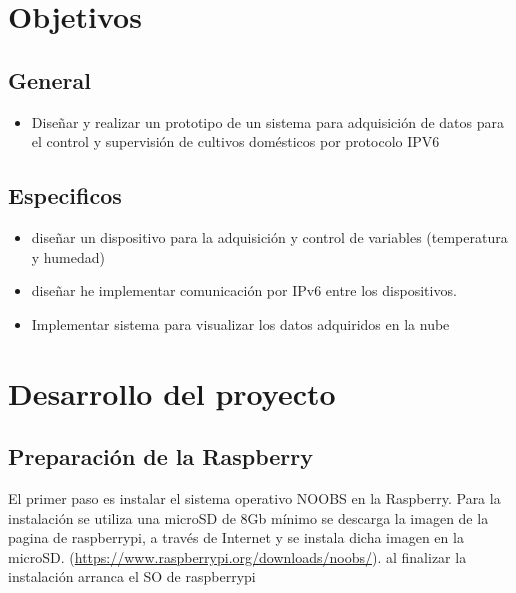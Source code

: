 \documentclass[10pt]{article}\usepackage[]{graphicx}\usepackage[]{color}
\begin{document}
	
	
	\section{Objetivos}
	
	\subsection{General}
	
	\begin{itemize}
		\item Diseñar y realizar un prototipo de un sistema para adquisición de datos para el control y supervisión de cultivos domésticos por protocolo IPV6
	\end{itemize}
	
	\subsection{Especificos}
	
	\begin{itemize}
		\item diseñar un dispositivo para la adquisición y control de variables (temperatura y humedad)
		\item diseñar he implementar comunicación por IPv6 entre los dispositivos.
		\item Implementar sistema para visualizar los datos adquiridos en la nube 
	\end{itemize}
	
	
	
	\section{Desarrollo del proyecto}	
	
	\subsection{Preparación de la Raspberry}
	
	El primer paso es instalar el sistema operativo NOOBS en la Raspberry. Para la instalación se utiliza una microSD de 8Gb mínimo se descarga la imagen de la pagina de raspberrypi, a través de Internet y se instala dicha imagen en la microSD. (\href{https://www.raspberrypi.org/downloads/noobs/}{https://www.raspberrypi.org/downloads/noobs/}). al finalizar la instalación arranca el SO de raspberrypi  
	
\end{document}
